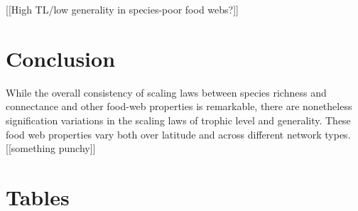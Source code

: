 \documentclass[12pt]{article}
\begin{document}
[[High TL/low generality in species-poor food webs?]]



\section*{Conclusion}

While the overall consistency of scaling laws between species richness and connectance and other food-web properties is 
remarkable, there are nonetheless signification variations in the scaling laws of trophic level and generality. These food web 
properties vary both over latitude and across different network types. [[something punchy]]

\newpage

\section*{Tables}
\end{document}
